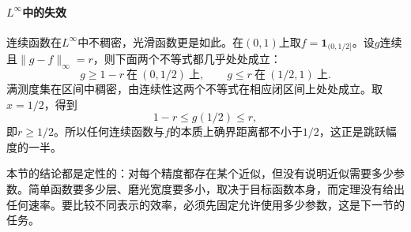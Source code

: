 \paragraph{$L^\infty$中的失效}
连续函数在$L^\infty$中不稠密，光滑函数更是如此。在$(0,1)$上取$f=\mathbf 1_{(0,1/2]}$。设$g$连续且$\lVert g-f\rVert_\infty=r$，则下面两个不等式都几乎处处成立：
\[
 g\geq1-r\ \text{在}\ (0,1/2)\ \text{上},\qquad g\leq r\ \text{在}\ (1/2,1)\ \text{上}.
\]
满测度集在区间中稠密，由连续性这两个不等式在相应闭区间上处处成立。取$x=1/2$，得到
\[
 1-r\leq g(1/2)\leq r ,
\]
即$r\geq1/2$。所以任何连续函数与$f$的本质上确界距离都不小于$1/2$，这正是跳跃幅度的一半。

本节的结论都是定性的：对每个精度都存在某个近似，但没有说明近似需要多少参数。简单函数要多少层、磨光宽度要多小，取决于目标函数本身，而定理没有给出任何速率。要比较不同表示的效率，必须先固定允许使用多少参数，这是下一节的任务。
